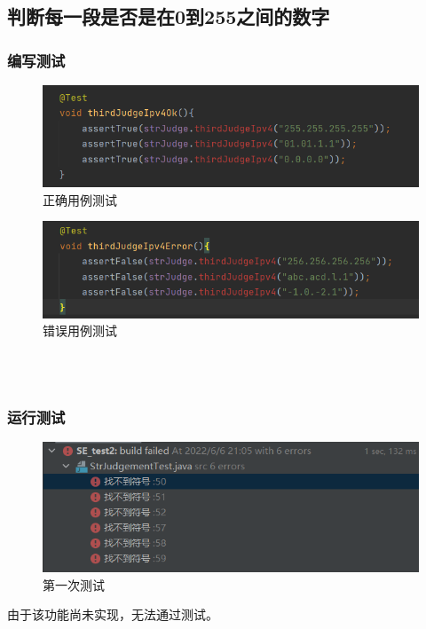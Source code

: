 \documentclass[a4paper]{article}
\begin{document}
\subsection{判断每一段是否是在0到255之间的数字}
\subsubsection*{编写测试}
\begin{figure}[h]
    \centering
    \includegraphics[scale=0.8]{3.1.png}
    \caption{正确用例测试}
    \label{fig:12}
\end{figure}
\begin{figure}[h]
    \centering
    \includegraphics[scale=0.8]{3.2.png}
    \caption{错误用例测试}
    \label{fig:13}
\end{figure}
~\\~\\
\subsubsection*{运行测试}
\begin{figure}[h]
    \centering
    \includegraphics[scale=0.9]{3.3.png}
    \caption{第一次测试}
    \label{fig:14}
\end{figure}
由于该功能尚未实现，无法通过测试。
\end{document}
